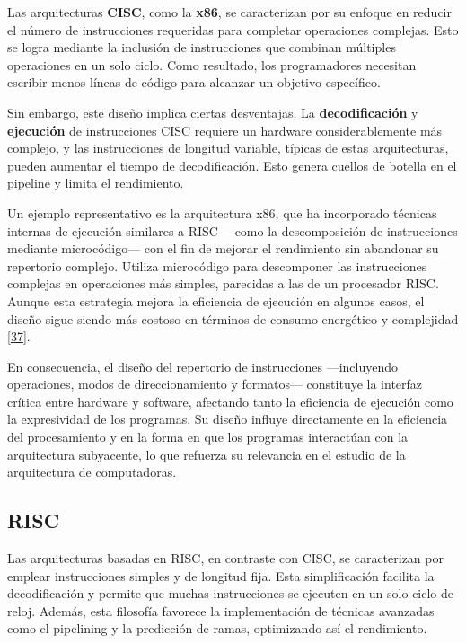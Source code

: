 \documentclass[12pt,oneside]{templates/unerthesis}
\begin{document}
Las arquitecturas \textbf{CISC}, como la \textbf{x86}, se caracterizan por su enfoque en reducir el número de instrucciones requeridas para completar operaciones complejas. Esto se logra mediante la inclusión de instrucciones que combinan múltiples operaciones en un solo ciclo. Como resultado, los programadores necesitan escribir menos líneas de código para alcanzar un objetivo específico.

Sin embargo, este diseño implica ciertas desventajas. La \textbf{decodificación} y \textbf{ejecución} de instrucciones CISC requiere un hardware considerablemente más complejo, y las instrucciones de longitud variable, típicas de estas arquitecturas, pueden aumentar el tiempo de decodificación. Esto genera cuellos de botella en el pipeline y limita el rendimiento.

Un ejemplo representativo es la arquitectura x86, que ha incorporado técnicas internas de ejecución similares a RISC ---como la descomposición de instrucciones mediante microcódigo--- con el fin de mejorar el rendimiento sin abandonar su repertorio complejo. Utiliza microcódigo para descomponer las instrucciones complejas en operaciones más simples, parecidas a las de un procesador RISC. Aunque esta estrategia mejora la eficiencia de ejecución en algunos casos, el diseño sigue siendo más costoso en términos de consumo energético y complejidad \protect\hyperlink{ref-patterson_computer_2014}{{[}37{]}}.

En consecuencia, el diseño del repertorio de instrucciones ---incluyendo operaciones, modos de direccionamiento y formatos--- constituye la interfaz crítica entre hardware y software, afectando tanto la eficiencia de ejecución como la expresividad de los programas. Su diseño influye directamente en la eficiencia del procesamiento y en la forma en que los programas interactúan con la arquitectura subyacente, lo que refuerza su relevancia en el estudio de la arquitectura de computadoras.

\hypertarget{RISC}{%
\subsection{RISC}\label{RISC}}

Las arquitecturas basadas en RISC, en contraste con CISC, se caracterizan por emplear instrucciones simples y de longitud fija. Esta simplificación facilita la decodificación y permite que muchas instrucciones se ejecuten en un solo ciclo de reloj. Además, esta filosofía favorece la implementación de técnicas avanzadas como el pipelining y la predicción de ramas, optimizando así el rendimiento.
\end{document}
